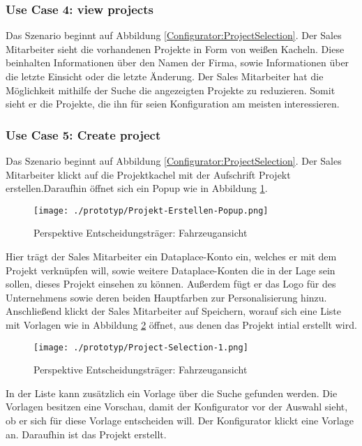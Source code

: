 \subsubsection{Use Case 4: view projects}
Das Szenario beginnt auf Abbildung \ref{Configurator:ProjectSelection}. Der Sales Mitarbeiter sieht die vorhandenen Projekte in Form von weißen Kacheln. Diese beinhalten Informationen über den Namen der Firma, sowie Informationen über die letzte Einsicht oder die letzte Änderung. Der Sales Mitarbeiter hat die Möglichkeit mithilfe der Suche die angezeigten Projekte zu reduzieren. Somit sieht er die Projekte, die ihn für seien Konfiguration am meisten interessieren.


\subsubsection{Use Case 5: Create project}

Das Szenario beginnt auf Abbildung \ref{Configurator:ProjectSelection}. Der Sales Mitarbeiter klickt auf die Projektkachel mit der Aufschrift Projekt erstellen.Daraufhin öffnet sich ein Popup wie in Abbildung \ref{Configurator:CreateProjectPopup}. 

\begin{figure}[ht]
  \centering
  \texttt{[image: ./prototyp/Projekt-Erstellen-Popup.png]}
  \caption{Perspektive Entscheidungsträger: Fahrzeugansicht}
  \label{Configurator:CreateProjectPopup}
\end{figure}

Hier trägt der Sales Mitarbeiter ein Dataplace-Konto ein, welches er mit dem Projekt verknüpfen will, sowie weitere Dataplace-Konten die in der Lage sein sollen, dieses Projekt einsehen zu können. Außerdem fügt er das Logo für des Unternehmens sowie deren beiden Hauptfarben zur Personalisierung hinzu. Anschließend klickt der Sales Mitarbeiter auf Speichern, worauf sich eine Liste mit Vorlagen wie in Abbildung \ref{Configurator:Template} öffnet, aus denen das Projekt intial erstellt wird.

\begin{figure}[ht]
  \centering
  \texttt{[image: ./prototyp/Project-Selection-1.png]}
  \caption{Perspektive Entscheidungsträger: Fahrzeugansicht}
  \label{Configurator:Template}
\end{figure}
In der Liste kann zusätzlich ein Vorlage über die Suche gefunden werden. Die Vorlagen besitzen eine Vorschau, damit der Konfigurator vor der Auswahl sieht, ob er sich für diese Vorlage entscheiden will. Der Konfigurator klickt eine Vorlage an. Daraufhin ist das Projekt erstellt.

